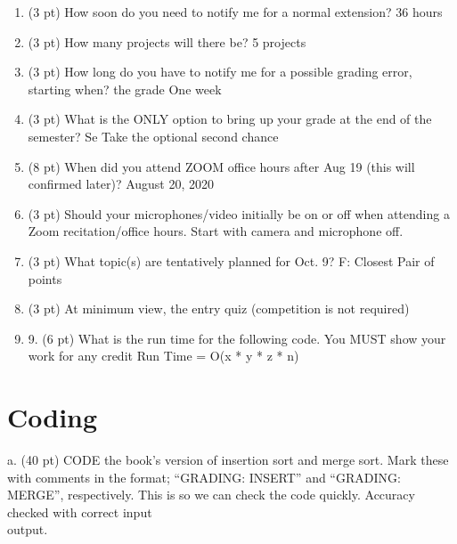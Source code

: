 \documentclass[12pt]{article}
\begin{document}
\begin{enumerate}

  \item (3 pt) How soon do you need to notify me for a normal extension? 
    36 hours

  \item (3 pt) How many projects will there be? 
    5 projects

  \item (3 pt) How long do you have to notify me for a possible grading error, starting when? the grade
    One week

  \item (3 pt) What is the ONLY option to bring up your grade at the end of the semester? Se
    Take the optional second chance 

  \item (8 pt) When did you attend ZOOM office hours after Aug 19 (this will confirmed later)?
    August 20, 2020  

  \item (3 pt) Should your microphones/video initially be on or off when attending a Zoom recitation/office hours.
    Start with camera and microphone off.

  \item (3 pt) What topic(s) are tentatively planned for Oct. 9?
    F: Closest Pair of points

  \item (3 pt) At minimum view, the entry quiz (competition is not required)

  \item 9. (6 pt) What is the run time for the following code. You MUST show your work for any credit
    Run Time = O(x * y * z * n)

\end{enumerate}



    

\section{Coding}

a. (40 pt) CODE the book’s version of insertion sort and merge sort. Mark these with
comments in the format; “GRADING: INSERT” and “GRADING: MERGE”, respectively. This is
so we can check the code quickly. Accuracy checked with correct input\\output.
\end{document}
